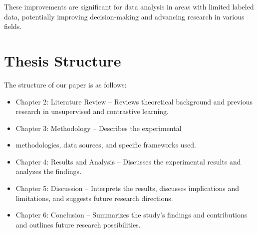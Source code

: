 These improvements are significant for data analysis in areas with limited labeled data, potentially improving decision-making and advancing research in various fields.

\section{Thesis Structure}
The structure of our paper is as follows:

\begin{itemize}
    \item Chapter 2: Literature Review – Reviews theoretical background and previous research in unsupervised and contrastive learning.
    \item Chapter 3: Methodology – Describes the experimental \item methodologies, data sources, and specific frameworks used.
    \item Chapter 4: Results and Analysis – Discusses the experimental results and analyzes the findings.
    \item Chapter 5: Discussion – Interprets the results, discusses implications and limitations, and suggests future research directions.
    \item Chapter 6: Conclusion – Summarizes the study's findings and contributions and outlines future research possibilities.
\end{itemize}